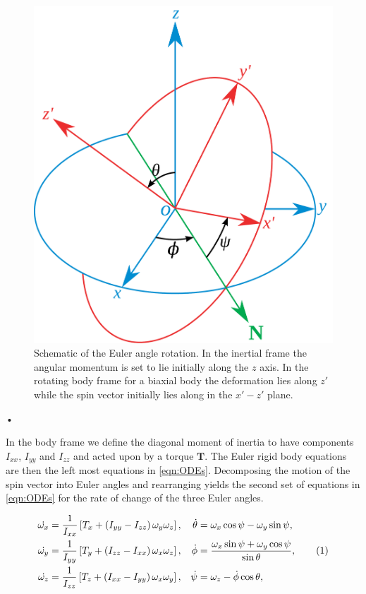 \documentclass[11pt]{article}
\numberwithin{equation}{section}
\numberwithin{figure}{section}
\numberwithin{table}{section}
\newcommand\numberthis{\addtocounter{equation}{1}\tag{\theequation}}
\begin{document}
\begin{figure}[ht]
\centering
\includegraphics[scale=0.25]{Eulerangles-alternative.pdf}
\caption{Schematic of the Euler angle rotation. In the inertial frame the
angular momentum is set to lie initially along the $z$ axis. In the rotating
body frame for a biaxial body the deformation lies along $z'$ while the spin
vector initially lies along in the $x'- z'$ plane.}
\label{fig:Euler}
\end{figure}•

In the body frame we define the diagonal moment of inertia to have components
$I_{xx}$, $I_{yy}$ and $I_{zz}$ and acted upon by a torque $\boldsymbol{T}$. The
Euler rigid body equations are then the left most equations in
\eqref{eqn:ODEs}.
Decomposing the motion of the spin vector into Euler angles and rearranging
yields the second set of equations in \eqref{eqn:ODEs} for the rate of change
of the three Euler angles.

\begin{align*}
\dot{\omega_{x}} & = \frac{1}{I_{xx}}\left[T_{x}  + \left(I_{yy} - I_{zz}\right) \omega_{y} \omega_{z}\right],   &  
       \dot{\theta} & = \omega_{x} \cos \psi - \omega_{y} \sin \psi,
 \\
\dot{\omega_{y}} & =  \frac{1}{I_{yy}}\left[T_{y}  + \left(I_{zz} - I_{xx}\right) \omega_{x} \omega_{z}\right], & 
     \dot{\phi}  & = \frac{\omega_{x} \sin \psi + \omega_{y} \cos \psi}{\sin \theta}, 
\numberthis \label{eqn:ODEs}
\\
\dot{\omega_{z}} & =\frac{1}{I_{zz}}\left[T_{z}  + \left(I_{xx} - I_{yy}\right) \omega_{x} \omega_{y}\right],  & 
     \dot{\psi} & =  \omega_{z} - \dot{\phi} \cos \theta ,
\end{align*}
\end{document}
